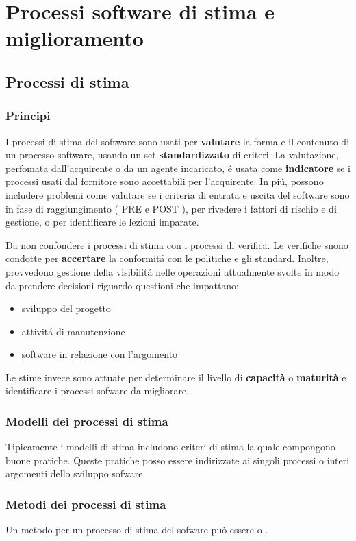 \chapter{Processi software di stima e miglioramento}
\section{Processi di stima}
\subsection{Principi}
I processi di stima del software sono usati per \textbf{valutare} la forma e il contenuto di un processo software, usando un set \textbf{standardizzato} di criteri. \newline
La valutazione, perfomata dall'acquirente o da un agente incaricato, \'e usata come \textbf{indicatore} se i processi usati dal fornitore sono accettabili per l'acquirente.\newline
In pi\'u, possono includere problemi come valutare se i criteria di entrata e uscita del software sono in fase di raggiungimento ( PRE e POST ), per rivedere i fattori di rischio e di gestione, o per identificare le lezioni imparate.\newline

Da non confondere i processi di stima con i processi di verifica. Le verifiche snono condotte per \textbf{accertare} la conformit\'a con le politiche e gli standard. Inoltre, provvedono gestione della visibilit\'a nelle operazioni attualmente svolte in modo da prendere decisioni riguardo questioni che impattano:
\begin{itemize}
\item sviluppo del progetto
\item attivit\'a di manutenzione
\item software in relazione con l'argomento
\end{itemize}
Le stime invece sono attuate per determinare il livello di \textbf{capacit\`a} o \textbf{maturit\`a} e identificare i processi sofware da migliorare.

\subsection{Modelli dei processi di stima}
Tipicamente i modelli di stima includono criteri di stima la quale compongono buone pratiche. \newline
Queste pratiche posso essere indirizzate ai singoli processi o interi argomenti dello sviluppo sofware.

\subsection{Metodi dei processi di stima}
Un metodo per un processo di stima del sofware pu\`o essere  o .

